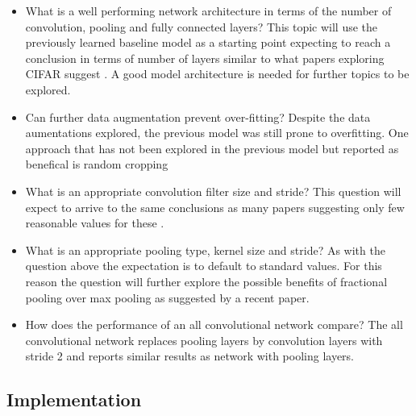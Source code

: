\documentclass[12pt]{article}
\begin{document}
\begin{itemize}
\item What is a well performing network architecture in terms of the number of convolution, pooling and fully connected layers? This topic will use the previously learned baseline model as a starting point expecting to reach a conclusion in terms of number of layers similar to what papers exploring CIFAR suggest \cite{inspiration}. A good model architecture is needed for further topics to be explored.
\item Can further data augmentation prevent over-fitting? Despite the data aumentations explored, the previous model was still prone to overfitting. One approach that has not been explored in the previous model but reported as benefical is random cropping\cite{kernel}\cite{crop}
\item What is an appropriate convolution filter size and stride? This question will expect to arrive to the same conclusions as many papers suggesting only few reasonable values for these \cite{inspiration}\cite{bestprac}\cite{frac}.
\item What is an appropriate pooling type, kernel size and stride? As with the question above the expectation is to default to standard values. For this reason the question will further explore the possible benefits of fractional pooling  over max pooling as suggested by a recent paper\cite{frac}.
\item How does the performance of an all convolutional network\cite{allconv} compare? The all convolutional network replaces pooling layers by convolution layers with stride 2 and reports similar results as network with pooling layers. 
\end{itemize}

\subsection*{Implementation}
\end{document}
